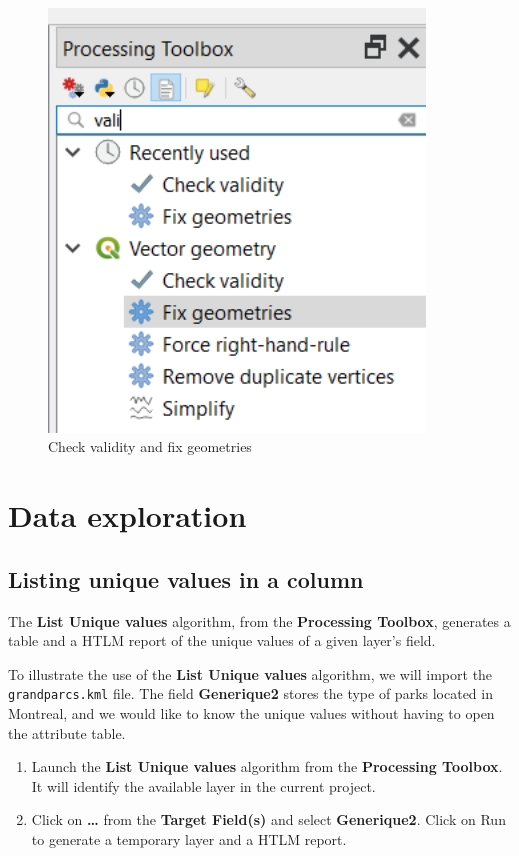 \documentclass[]{book}
\theoremstyle{definition}
\theoremstyle{definition}
\theoremstyle{definition}
\theoremstyle{remark}
\begin{document}
\begin{figure}

{\centering \includegraphics[width=3.94in]{figures/Validity_Fix_Geometry} 

}

\caption{Check validity and fix geometries}\label{fig:unnamed-chunk-22}
\end{figure}

\chapter{Data exploration}\label{data-exploration}

\section{Listing unique values in a
column}\label{listing-unique-values-in-a-column}

The \textbf{List Unique values} algorithm, from the \textbf{Processing
Toolbox}, generates a table and a HTLM report of the unique values of a
given layer's field.

To illustrate the use of the \textbf{List Unique values} algorithm, we
will import the \texttt{grandparcs.kml} file. The field
\textbf{Generique2} stores the type of parks located in Montreal, and we
would like to know the unique values without having to open the
attribute table.

\begin{enumerate}
\def\labelenumi{\arabic{enumi}.}
\item
  Launch the \textbf{List Unique values} algorithm from the
  \textbf{Processing Toolbox}. It will identify the available layer in
  the current project.
\item
  Click on \textbf{\ldots{}} from the \textbf{Target Field(s)} and
  select \textbf{Generique2}. Click on Run to generate a temporary layer
  and a HTLM report.
\end{enumerate}
\end{document}
